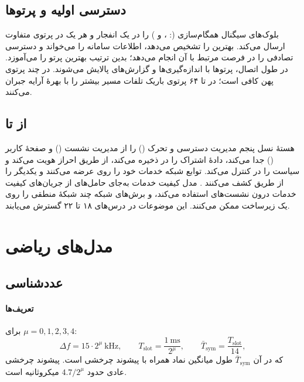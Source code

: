 \documentclass[11pt,a4paper]{article}
\begin{document}
\subsection{دسترسی اولیه و پرتوها}
 بلوک‌های سیگنال همگام‌سازی (: ،  و ) را در یک انفجار و هر یک در پرتوی
متفاوت ارسال می‌کند.  بهترین  را تشخیص می‌دهد، اطلاعات سامانه را می‌خواند و دسترسی تصادفی را در فرصت
 مرتبط با آن  انجام می‌دهد؛ بدین ترتیب  بهترین پرتو را می‌آموزد. در طول اتصال، پرتوها با
اندازه‌گیری‌ها و گزارش‌های  پالایش می‌شوند. در  چند پرتوی پهن کافی است؛ در  تا ۶۴ پرتوی باریک
تلفات مسیر بیشتر را با بهرهٔ آرایه جبران می‌کنند.

\subsection{از  تا }
هستهٔ نسل پنجم مدیریت دسترسی و تحرک () را از مدیریت نشست () و صفحهٔ کاربر () جدا می‌کند،
دادهٔ اشتراک را در  ذخیره می‌کند، از طریق  احراز هویت می‌کند و سیاست را در  کنترل می‌کند.
توابع شبکه خدمات خود را روی  عرضه می‌کنند و یکدیگر را از طریق  کشف می‌کنند \cite{ts23501}. مدل کیفیت
خدمات به‌جای حامل‌های  از جریان‌های کیفیت خدمات درون نشست‌های  استفاده می‌کند، و برش‌های شبکه چند
شبکهٔ منطقی را روی یک زیرساخت ممکن می‌کنند. این موضوعات در درس‌های ۱۸ تا ۲۲ گسترش می‌یابند.

\section{مدل‌های ریاضی}

\subsection{عددشناسی}\label{sec:num}
\paragraph{تعریف‌ها} برای $\mu = 0,1,2,3,4$:
\begin{equation}\label{eq:numerology}
  \Delta f = 15\cdot2^{\mu}\ \text{kHz}, \qquad
  T_{\mathrm{slot}} = \frac{1\ \text{ms}}{2^{\mu}}, \qquad
  \bar T_{\mathrm{sym}} = \frac{T_{\mathrm{slot}}}{14},
\end{equation}
که در آن $\bar T_{\mathrm{sym}}$ طول میانگین نماد همراه با پیشوند چرخشی است. پیشوند چرخشی عادی حدود $4.7/2^\mu$ میکروثانیه
است.
\end{document}
